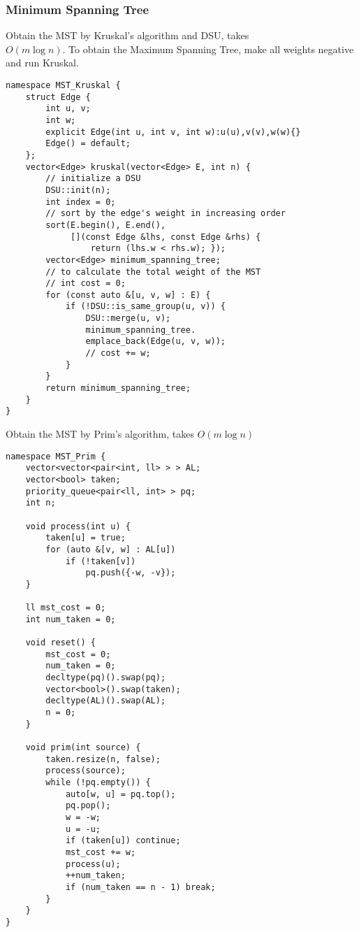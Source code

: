 \documentclass[10pt]{article}{\twocolumn}
\begin{document}
\subsubsection{Minimum Spanning Tree}
Obtain the MST by Kruskal's algorithm and DSU, takes\\
$O(m\log{n})$. To obtain the Maximum Spanning Tree, make all weights negative and run Kruskal.
\begin{lstlisting}
namespace MST_Kruskal {
    struct Edge {
        int u, v;
        int w;
        explicit Edge(int u, int v, int w):u(u),v(v),w(w){}
        Edge() = default;
    };
    vector<Edge> kruskal(vector<Edge> E, int n) {
        // initialize a DSU
        DSU::init(n);
        int index = 0;
        // sort by the edge's weight in increasing order
        sort(E.begin(), E.end(),
             [](const Edge &lhs, const Edge &rhs) {
                 return (lhs.w < rhs.w); });
        vector<Edge> minimum_spanning_tree;
        // to calculate the total weight of the MST
        // int cost = 0;
        for (const auto &[u, v, w] : E) {
            if (!DSU::is_same_group(u, v)) {
                DSU::merge(u, v);
                minimum_spanning_tree.
                emplace_back(Edge(u, v, w));
                // cost += w;
            }
        }
        return minimum_spanning_tree;
    }
}
\end{lstlisting}
Obtain the MST by Prim's algorithm, takes $O(m\log{n})$
\begin{lstlisting}
namespace MST_Prim {
    vector<vector<pair<int, ll> > > AL;
    vector<bool> taken;
    priority_queue<pair<ll, int> > pq;
    int n;

    void process(int u) {
        taken[u] = true;
        for (auto &[v, w] : AL[u])
            if (!taken[v])
                pq.push({-w, -v});
    }

    ll mst_cost = 0;
    int num_taken = 0;

    void reset() {
        mst_cost = 0;
        num_taken = 0;
        decltype(pq)().swap(pq);
        vector<bool>().swap(taken);
        decltype(AL)().swap(AL);
        n = 0;
    }

    void prim(int source) {
        taken.resize(n, false);
        process(source);
        while (!pq.empty()) {
            auto[w, u] = pq.top();
            pq.pop();
            w = -w;
            u = -u;
            if (taken[u]) continue;
            mst_cost += w;
            process(u);
            ++num_taken;
            if (num_taken == n - 1) break;
        }
    }
}
\end{lstlisting}
\end{document}
